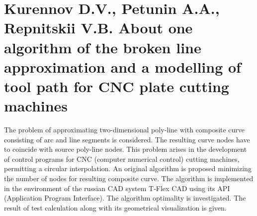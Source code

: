 \part{Kurennov D.V., Petunin A.A., Repnitskii V.B.
About one algorithm of the broken line approximation and a modelling of tool path
for CNC plate cutting machines}

The problem of approximating two-dimensional poly-line
with composite curve consisting of arc and line segments
is considered.
The resulting curve nodes have to coincide with source poly-line nodes.
This problem arises in the development of control programs
for CNC (computer numerical control) cutting machines,
permitting a circular interpolation.
An original algorithm is proposed
minimizing the number of nodes for resulting composite curve.
The algorithm is implemented in the environment of the russian CAD system 
T-Flex CAD using its API (Application Program Interface).
The algorithm optimality is investigated.
The result of test calculation along with its geometrical visualization is given.
